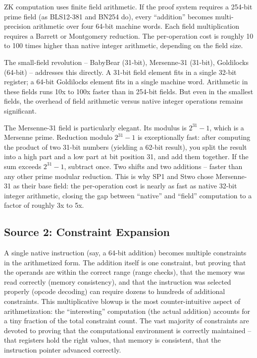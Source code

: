 \documentclass[
  11pt,
  openany]{report}
\begin{document}
ZK computation uses finite field arithmetic. If the proof system requires a
254-bit prime field (as BLS12-381 and BN254 do), every ``addition'' becomes
multi-precision arithmetic over four 64-bit machine words. Each field
multiplication requires a Barrett or Montgomery reduction. The per-operation
cost is roughly 10 to 100 times higher than native integer arithmetic, depending
on the field size.

The small-field revolution -- BabyBear (31-bit), Mersenne-31 (31-bit),
Goldilocks (64-bit) -- addresses this directly. A 31-bit field element fits in a
single 32-bit register; a 64-bit Goldilocks element fits in a single machine
word. Arithmetic in these fields runs 10x to 100x faster than in 254-bit fields.
But even in the smallest fields, the overhead of field arithmetic versus native
integer operations remains significant.

The Mersenne-31 field is particularly elegant. Its modulus is \(2^{31} - 1\),
which is a Mersenne prime. Reduction modulo \(2^{31} - 1\) is exceptionally
fast: after computing the product of two 31-bit numbers (yielding a 62-bit
result), you split the result into a high part and a low part at bit position
31, and add them together. If the sum exceeds \(2^{31} - 1\), subtract once. Two
shifts and two additions -- faster than any other prime modular reduction. This
is why SP1 and Stwo chose Mersenne-31 as their base field: the per-operation
cost is nearly as fast as native 32-bit integer arithmetic, closing the gap
between ``native'' and ``field'' computation to a factor of roughly 3x to 5x.

\subsection{Source 2: Constraint Expansion}\label{source-2-constraint-expansion}

A single native instruction (say, a 64-bit addition) becomes multiple
constraints in the arithmetized form. The addition itself is one constraint, but
proving that the operands are within the correct range (range checks), that the
memory was read correctly (memory consistency), and that the instruction was
selected properly (opcode decoding) can require dozens to hundreds of additional
constraints. This multiplicative blowup is the most counter-intuitive aspect of
arithmetization: the ``interesting'' computation (the actual addition) accounts
for a tiny fraction of the total constraint count. The vast majority of
constraints are devoted to proving that the computational environment is
correctly maintained -- that registers hold the right values, that memory is
consistent, that the instruction pointer advanced correctly.
\end{document}
